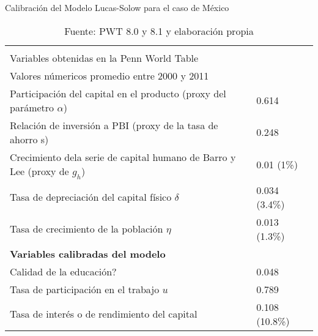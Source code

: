 \documentclass[12pt,notitlepage]{report}
\newcommand{\saltito}{\\[-3mm]}
\newcommand{\blankpage}{
	\newpage
	\thispagestyle{empty}
	\mbox{}
	\newpage
}
\begin{document}
     	\begin{table}[H]
     		\caption{Calibración del Modelo Lucas-Solow para el caso de México}\label{t1}
     		\vspace{0.7cm}
     		\begin{tabular}{|l|l|}
     			\hline
     			\parbox{8cm}{\textbf{\saltito Variables obtenidas en la Penn World Table}} & \parbox{8cm}{\textbf{\saltito Valores númericos promedio entre 2000 y 2011}} \\ 
     			\hline
     			\parbox{8cm}{Participación del capital en el producto (proxy del parámetro $\alpha$)}&0.614\\
     			\hline
     			\parbox{8cm}{Relación de inversión a PBI (proxy de la tasa de ahorro s)}& 0.248\\
     			\hline
     			\parbox{8cm}{Crecimiento dela serie de capital humano de Barro y Lee (proxy de $g_h$)}&0.01 (1\%)\\
     			\hline
     			Tasa de depreciación del capital físico $\delta$ &0.034 (3.4\%)\\
     			\hline
     			Tasa de crecimiento de la población $\eta$ &0.013 (1.3\%)\\
     			\hline
     			\textbf{Variables calibradas del modelo}&\\
     			\hline
     			Calidad de la educación?& 0.048\\
     			\hline
     			Tasa de participación en el trabajo $u$&0.789\\
     			\hline
     			Tasa de interés o de rendimiento del capital&0.108 (10.8\%)\\
     			\hline
     		\end{tabular}
     		\vspace{0.3cm}
     		\captionsetup{singlelinecheck=off}
     		\caption*{Fuente: PWT 8.0 y 8.1 y elaboración propia}
     	\end{table}
     	\blankpage
     	\nocite{*}
     	
     	
     	
     	
\end{document}
